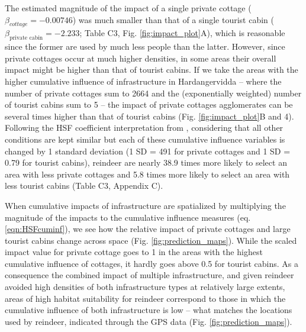 \documentclass[titlepage]{article}
\begin{document}
The estimated magnitude of the impact of a single private
cottage ($\beta_{cottage} = -0.00746$) was much smaller than that of a single tourist cabin
($\beta_{\text{private cabin}} = -2.233$; Table C3, Fig. \ref{fig:impact_plot}A), which is reasonable since the former are used by much less people than the latter. However, since
private cottages occur at much higher densities, in some areas their overall impact 
might be higher than that of tourist cabins. If we take the areas with the 
higher cumulative influence of infrastructure in Hardangervidda -- where the number of private cottages sum to 2664 
and the (exponentially weighted) number of tourist cabins sum to 5 -- the impact of 
private cottages agglomerates can be several times higher than that of tourist cabins
 (Fig. \ref{fig:impact_plot}B and 4). Following the HSF coefficient interpretation from \citealp{fieberg_how_2021}, considering that all other conditions are kept similar but each of these 
cumulative influence variables is changed by 1 standard deviation (1 SD = 491 for private cottages and
1 SD = 0.79 for tourist cabins), reindeer are nearly 38.9 times more likely to select an area with less private cottages and 5.8 times more likely
to select an area with less tourist cabins (Table C3, Appendix C).

When cumulative impacts of infrastructure are spatialized by multiplying the magnitude of the impacts to the cumulative influence measures (eq. \ref{eqn:HSFcuminf}), we see how the relative impact of private cottages and large tourist cabins change across space (Fig. \ref{fig:prediction_maps}). While the scaled impact value for private cottage goes to 1 in the areas with the highest cumulative influence of cottages, it hardly goes above 0.5 for tourist cabins. As a consequence the combined impact of multiple infrastructure, and given reindeer
avoided high densities of both infrastructure types at relatively large extents, 
areas of high habitat suitability for reindeer correspond to those in which the
cumulative influence of both infrastructure is low -- what matches the
locations used by reindeer, indicated through the GPS data (Fig. \ref{fig:prediction_maps}).
\end{document}
